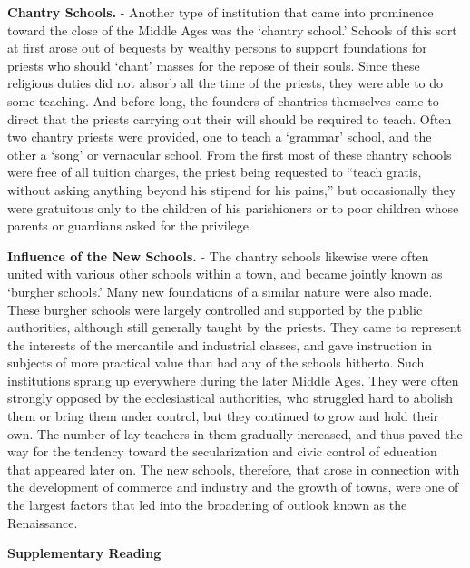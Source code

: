 \documentclass[
]{book}
\begin{document}
\textbf{Chantry Schools.} - Another type of institution that came into prominence toward the close of the Middle Ages was the `chantry school.' Schools of this sort at first arose out of bequests by wealthy persons to support foundations for priests who should `chant' masses for the repose of their souls. Since these religious duties did not absorb all the time of the priests, they were able to do some teaching. And before long, the founders of chantries themselves came to direct that the priests carrying out their will should be required to teach. Often two chantry priests were provided, one to teach a `grammar' school, and the other a `song' or vernacular school. From the first most of these chantry schools were free of all tuition charges, the priest being requested to ``teach gratis, without asking anything beyond his stipend for his pains,'' but occasionally they were gratuitous only to the children of his parishioners or to poor children whose parents or guardians asked for the privilege.

\textbf{Influence of the New Schools.} - The chantry schools likewise were often united with various other schools within a town, and became jointly known as `burgher schools.' Many new foundations of a similar nature were also made. These burgher schools were largely controlled and supported by the public authorities, although still generally taught by the priests. They came to represent the interests of the mercantile and industrial classes, and gave instruction in subjects of more practical value than had any of the schools hitherto. Such institutions sprang up everywhere during the later Middle Ages. They were often strongly opposed by the ecclesiastical authorities, who struggled hard to abolish them or bring them under control, but they continued to grow and hold their own. The number of lay teachers in them gradually increased, and thus paved the way for the tendency toward the secularization and civic control of education that appeared later on. The new schools, therefore, that arose in connection with the development of commerce and industry and the growth of towns, were one of the largest factors that led into the broadening of outlook known as the Renaissance.

\textbf{Supplementary Reading}
\end{document}
